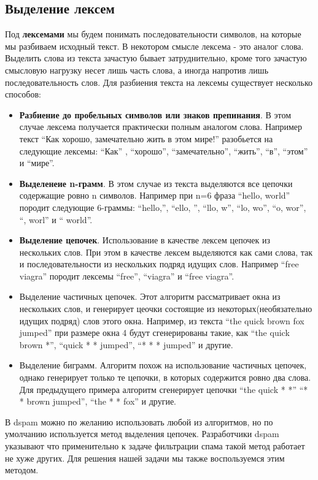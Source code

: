\subsection{Выделение лексем}
Под \textbf{лексемами} мы будем понимать последовательности символов, на которые мы разбиваем исходный текст. В некотором смысле лексема - это аналог слова. Выделить слова из текста зачастую бывает затруднительно, кроме того зачастую смысловую нагрузку несет лишь часть слова, а иногда напротив лишь последовательность слов. Для разбиения текста на лексемы существует несколько способов:
\begin{itemize}
\item \textbf{Разбиение до пробельных символов или знаков препинания}. В этом случае лексема получается практически полным аналогом слова. Например текст ``Как хорошо, замечательно жить в этом мире!'' разобьется на следующие лексемы:
 ``Как'' , ``хорошо'', ``замечательно'', ``жить'', ``в'', ``этом'' и ``мире''.

 \item \textbf{Выделенеие n-грамм}. В этом случае из текста выделяются все цепочки содержащие ровно n символов. Например при n=6 фраза ``hello, world'' породит следующие 6-граммы: ``hello,'', ``ello, '', ``llo, w'', ``lo, wo'', ``o, wor'', ``, worl'' и `` world''.

 \item \textbf{Выделение цепочек}. Использование в качестве лексем цепочек из нескольких слов. При этом в качестве лексем выделяются как сами слова, так и последовательности из нескольких подряд идущих слов. Например ``free viagra'' породит лексемы ``free'', ``viagra'' и ``free viagra''.
\item {Выделение частичных цепочек}. Этот алгоритм рассматривает окна из нескольких слов, и генерирует цеочки состоящие из некоторых(необязательно идущих подряд) слов этого окна. Например, из  текста ``the quick brown fox jumped'' при размере окна 4 будут сгенерированы такие, как ``the quick brown *'', ``quick * * jumped'', ``* * * jumped'' и другие.

\item {Выделение биграмм}. Алгоритм похож на использование частичных цепочек, однако генерирует только те цепочки, в которых содержится ровно два слова. Для предыдущего примера алгоритм сгенерирует цепочки ``the quick * *'' ``* * brown jumped'', ``the * * fox''  и другие.
\end{itemize}

В dspam можно по желанию использовать любой из алгоритмов, но по умолчанию используется метод выделения цепочек. Разработчики dspam указывают\cite{TOKS} что применительно к задаче фильтрации спама такой метод работает не хуже других. Для решения нашей задачи мы также воспользуемся этим методом.

